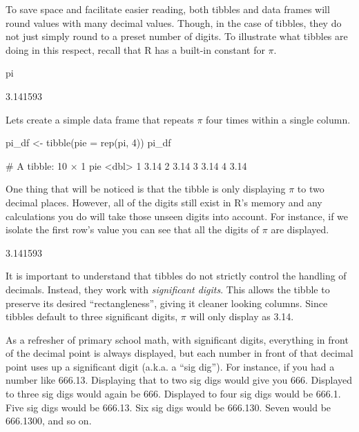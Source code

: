 To save space and facilitate easier reading, both tibbles and data frames will round values with many decimal values. Though, in the case of tibbles, they do not just simply round to a preset number of digits.  To illustrate what tibbles are doing in this respect, recall that R has a built-in constant for $\pi$.

\begin{inR}
pi
\end{inR}
\begin{outR}
[1] 3.141593
\end{outR}

\noindent
Lets create a simple data frame that repeats $\pi$ four times within a single column.

\begin{inR}
pi_df <- tibble(pie = rep(pi, 4))
pi_df
\end{inR}
\begin{outR}
# A tibble: 10 × 1
     pie
   <dbl>
 1  3.14
 2  3.14
 3  3.14
 4  3.14
\end{outR}

\noindent
One thing that will be noticed is that the tibble is only displaying $\pi$ to two decimal places. However, all of the digits still exist in R's memory and any calculations you do will take those unseen digits into account. For instance, if we isolate the first row's value you can see that all the digits of $\pi$ are displayed.

\begin{outR}
[1] 3.141593
\end{outR}

\noindent
It is important to understand that tibbles do not strictly control the handling of decimals. Instead, they work with \textit{significant digits}.  This allows the tibble to preserve its desired ``rectangleness'', giving it cleaner looking columns. Since tibbles default to three significant digits, $\pi$ will only display as 3.14. 

As a refresher of primary school math, with significant digits, everything in front of the decimal point is always displayed, but each number in front of that decimal point uses up a significant digit (a.k.a. a ``sig dig''). For instance, if you had a number like 666.13.  Displaying that to two sig digs would give you 666.  Displayed to three sig digs would again be 666. Displayed to four sig digs would be 666.1. Five sig digs would be 666.13. Six sig digs would be 666.130. Seven would be 666.1300, and so on.

